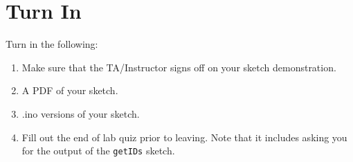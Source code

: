\section{Turn In}
Turn in the following:
\begin{enumerate}
    \item Make sure that the TA/Instructor signs off on your sketch demonstration.
    \item A PDF of your sketch.
    \item .ino versions of your sketch.
    \item Fill out the end of lab quiz prior to leaving. Note that it includes asking you 
            for the output of the \lstinline$getIDs$ sketch. 
\end{enumerate}